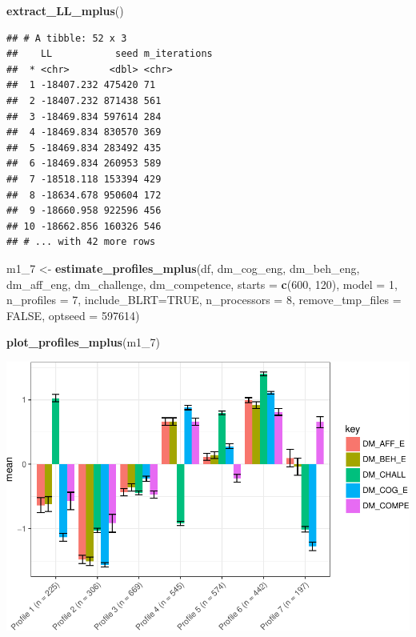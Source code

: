 \documentclass[]{msu-thesis}
\newenvironment{Shaded}{\begin{snugshade}}{\end{snugshade}}
\newcommand{\KeywordTok}[1]{\textcolor[rgb]{0.13,0.29,0.53}{\textbf{#1}}}
\newcommand{\DataTypeTok}[1]{\textcolor[rgb]{0.13,0.29,0.53}{#1}}
\newcommand{\DecValTok}[1]{\textcolor[rgb]{0.00,0.00,0.81}{#1}}
\newcommand{\StringTok}[1]{\textcolor[rgb]{0.31,0.60,0.02}{#1}}
\newcommand{\OtherTok}[1]{\textcolor[rgb]{0.56,0.35,0.01}{#1}}
\newcommand{\NormalTok}[1]{#1}
\theoremstyle{definition}
\theoremstyle{definition}
\theoremstyle{definition}
\theoremstyle{remark}
\begin{document}
\begin{Shaded}
\begin{Highlighting}[]
\KeywordTok{extract_LL_mplus}\NormalTok{()}
\end{Highlighting}
\end{Shaded}

\begin{verbatim}
## # A tibble: 52 x 3
##    LL           seed m_iterations
##  * <chr>       <dbl> <chr>       
##  1 -18407.232 475420 71          
##  2 -18407.232 871438 561         
##  3 -18469.834 597614 284         
##  4 -18469.834 830570 369         
##  5 -18469.834 283492 435         
##  6 -18469.834 260953 589         
##  7 -18518.118 153394 429         
##  8 -18634.678 950604 172         
##  9 -18660.958 922596 456         
## 10 -18662.856 160326 546         
## # ... with 42 more rows
\end{verbatim}

\begin{Shaded}
\begin{Highlighting}[]
\NormalTok{m1_}\DecValTok{7}\NormalTok{ <-}\StringTok{ }\KeywordTok{estimate_profiles_mplus}\NormalTok{(df,  }
\NormalTok{                             dm_cog_eng, dm_beh_eng, dm_aff_eng, dm_challenge, dm_competence,}
                             \DataTypeTok{starts =} \KeywordTok{c}\NormalTok{(}\DecValTok{600}\NormalTok{, }\DecValTok{120}\NormalTok{),}
                             \DataTypeTok{model =} \DecValTok{1}\NormalTok{,}
                             \DataTypeTok{n_profiles =} \DecValTok{7}\NormalTok{,}
                             \DataTypeTok{include_BLRT=}\OtherTok{TRUE}\NormalTok{,}
                             \DataTypeTok{n_processors =} \DecValTok{8}\NormalTok{, }\DataTypeTok{remove_tmp_files =} \OtherTok{FALSE}\NormalTok{, }\DataTypeTok{optseed =} \DecValTok{597614}\NormalTok{)}

\KeywordTok{plot_profiles_mplus}\NormalTok{(m1_}\DecValTok{7}\NormalTok{)}
\end{Highlighting}
\end{Shaded}

\includegraphics{rosenberg-dissertation_files/figure-latex/anotherm1-7-solution-1.pdf}
\end{document}
